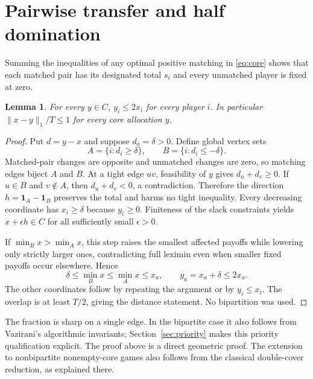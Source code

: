 \documentclass[11pt]{article}
\newtheorem{lemma}{Lemma}
\begin{document}
\section{Pairwise transfer and half domination}
Summing the inequalities of any optimal positive matching in \eqref{eq:core}
shows that each matched pair has its designated total $s_i$ and every
unmatched player is fixed at zero.
\begin{lemma}\label{lem:half}
For every $y\in C$, $y_i\le2x_i$ for every player $i$. In particular
$\|x-y\|_1/T\le1$ for every core allocation $y$.
\end{lemma}
\begin{proof}
Put $d=y-x$ and suppose $d_a=\delta>0$. Define global vertex sets
\[
 A=\{i:d_i\ge\delta\},\qquad B=\{i:d_i\le-\delta\}.
\]
Matched-pair changes are opposite and unmatched changes are zero, so matching
edges biject $A$ and $B$. At a tight edge $uv$, feasibility of $y$ gives
$d_u+d_v\ge0$. If $u\in B$ and $v\notin A$, then
$d_u+d_v<0$, a contradiction. Therefore the direction
$h=\mathbf1_A-\mathbf1_B$ preserves the total and harms no tight inequality.
Every decreasing coordinate has $x_i\ge\delta$ because $y_i\ge0$.
Finiteness of the slack constraints yields $x+\epsilon h\in C$ for all
sufficiently small $\epsilon>0$.

If $\min_Bx>\min_Ax$, this step raises the smallest affected payoffs while
lowering only strictly larger ones, contradicting full leximin even when
smaller fixed payoffs occur elsewhere. Hence
\[
 \delta\le\min_Bx\le\min_Ax\le x_a,
 \qquad y_a=x_a+\delta\le2x_a.
\]
The other coordinates follow by repeating the argument or by $y_i\le x_i$.
The overlap is at least $T/2$, giving the distance statement.
No bipartition was used.
\end{proof}
The fraction is sharp on a single edge. In the bipartite case it also follows
from Vazirani's algorithmic invariants; Section~\ref{sec:priority} makes this
priority qualification explicit. The proof above is a direct geometric proof.
The extension to nonbipartite nonempty-core games also follows from the
classical double-cover reduction, as explained there.
\end{document}
